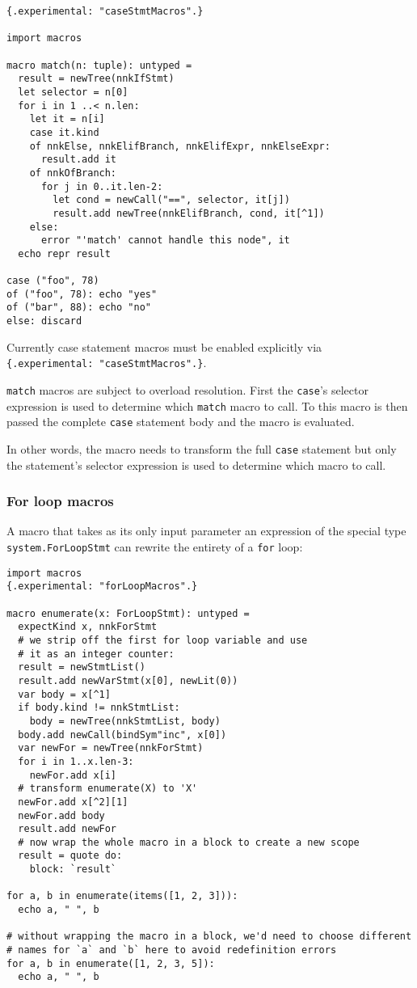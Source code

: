 \begin{verbatim}
{.experimental: "caseStmtMacros".}

import macros

macro match(n: tuple): untyped =
  result = newTree(nnkIfStmt)
  let selector = n[0]
  for i in 1 ..< n.len:
    let it = n[i]
    case it.kind
    of nnkElse, nnkElifBranch, nnkElifExpr, nnkElseExpr:
      result.add it
    of nnkOfBranch:
      for j in 0..it.len-2:
        let cond = newCall("==", selector, it[j])
        result.add newTree(nnkElifBranch, cond, it[^1])
    else:
      error "'match' cannot handle this node", it
  echo repr result

case ("foo", 78)
of ("foo", 78): echo "yes"
of ("bar", 88): echo "no"
else: discard
\end{verbatim}

Currently case statement macros must be enabled explicitly via
\texttt{\{.experimental:\ "caseStmtMacros".\}}.

\texttt{match} macros are subject to overload resolution. First the
\texttt{case}'s selector expression is used to determine which
\texttt{match} macro to call. To this macro is then passed the complete
\texttt{case} statement body and the macro is evaluated.

In other words, the macro needs to transform the full \texttt{case}
statement but only the statement's selector expression is used to
determine which macro to call.

\hypertarget{for-loop-macros}{%
\subsubsection{For loop macros}\label{for-loop-macros}}

A macro that takes as its only input parameter an expression of the
special type \texttt{system.ForLoopStmt} can rewrite the entirety of a
\texttt{for} loop:

\begin{verbatim}
import macros
{.experimental: "forLoopMacros".}

macro enumerate(x: ForLoopStmt): untyped =
  expectKind x, nnkForStmt
  # we strip off the first for loop variable and use
  # it as an integer counter:
  result = newStmtList()
  result.add newVarStmt(x[0], newLit(0))
  var body = x[^1]
  if body.kind != nnkStmtList:
    body = newTree(nnkStmtList, body)
  body.add newCall(bindSym"inc", x[0])
  var newFor = newTree(nnkForStmt)
  for i in 1..x.len-3:
    newFor.add x[i]
  # transform enumerate(X) to 'X'
  newFor.add x[^2][1]
  newFor.add body
  result.add newFor
  # now wrap the whole macro in a block to create a new scope
  result = quote do:
    block: `result`

for a, b in enumerate(items([1, 2, 3])):
  echo a, " ", b

# without wrapping the macro in a block, we'd need to choose different
# names for `a` and `b` here to avoid redefinition errors
for a, b in enumerate([1, 2, 3, 5]):
  echo a, " ", b
\end{verbatim}

